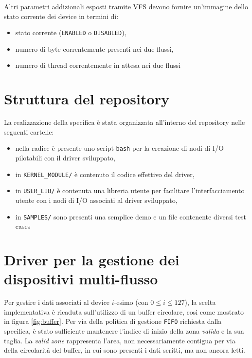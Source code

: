 \documentclass{article}
\begin{document}
Altri parametri addizionali esposti tramite VFS devono fornire un'immagine dello stato corrente dei device in termini di:
\begin{itemize}
        \item stato corrente (\texttt{ENABLED} o \texttt{DISABLED}),
        \item numero di byte correntemente presenti nei due flussi,
        \item numero di thread correntemente in attesa nei due flussi
\end{itemize}

\section*{Struttura del repository}
La realizzazione della specifica è stata organizzata all'interno del repository nelle seguenti cartelle:
\begin{itemize}
        \item nella radice è presente uno script \texttt{bash} per la creazione di nodi di I/O pilotabili con il driver sviluppato,
        \item in \texttt{KERNEL\_MODULE/} è contenuto il codice effettivo del driver,
        \item in \texttt{USER\_LIB/} è contenuta una libreria utente per facilitare l'interfacciamento utente con i nodi di I/O associati al driver sviluppato,
        \item in \texttt{SAMPLES/} sono presenti una semplice demo e un file contenente diversi test cases
\end{itemize}

\section*{Driver per la gestione dei dispositivi multi-flusso}
Per gestire i dati associati al device $i$-esimo (con $0\leq i\leq127$), la scelta implementativa è ricaduta sull'utilizzo di un buffer circolare, così come mostrato in figura \ref{fig:buffer}. Per via della politica di gestione \texttt{FIFO} richiesta dalla specifica, è stato sufficiente mantenere l'indice di inizio della zona \textit{valida} e la sua taglia. La \textit{valid zone} rappresenta l'area, non necessariamente contigua per via della circolarità del buffer, in cui sono presenti i dati scritti, ma non ancora letti.
\end{document}
